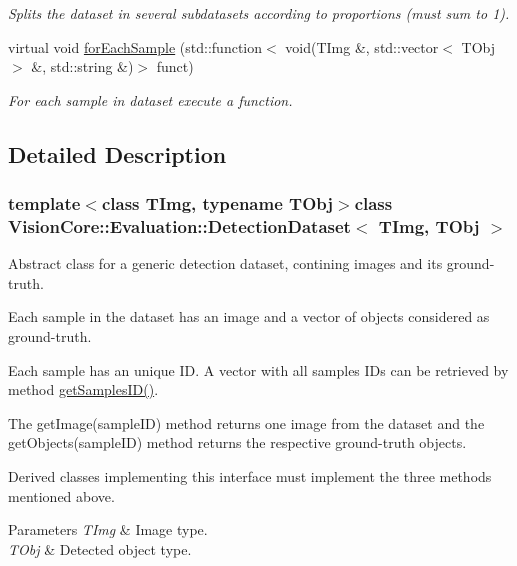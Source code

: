 \begin{DoxyCompactItemize}
\begin{DoxyCompactList}\small\item\em Splits the dataset in several subdatasets according to proportions (must sum to 1). \end{DoxyCompactList}\item 
virtual void \hyperlink{class_vision_core_1_1_evaluation_1_1_detection_dataset_af6f37eeccc1f47bbe5ec0e38199ca8bf}{for\+Each\+Sample} (std\+::function$<$ void(T\+Img \&, std\+::vector$<$ T\+Obj $>$ \&, std\+::string \&)$>$ funct)
\begin{DoxyCompactList}\small\item\em For each sample in dataset execute a function. \end{DoxyCompactList}\end{DoxyCompactItemize}


\subsection{Detailed Description}
\subsubsection*{template$<$class T\+Img, typename T\+Obj$>$class Vision\+Core\+::\+Evaluation\+::\+Detection\+Dataset$<$ T\+Img, T\+Obj $>$}

Abstract class for a generic detection dataset, contining images and its ground-\/truth. 

Each sample in the dataset has an image and a vector of objects considered as ground-\/truth.

Each sample has an unique I\+D. A vector with all samples I\+Ds can be retrieved by method \textquotesingle{}\hyperlink{class_vision_core_1_1_evaluation_1_1_detection_dataset_a4baafaba65ce3ae8e9fc8a5f74f5e0f8}{get\+Samples\+I\+D()}\textquotesingle{}.

The \textquotesingle{}get\+Image(sample\+I\+D)\textquotesingle{} method returns one image from the dataset and the \textquotesingle{}get\+Objects(sample\+I\+D)\textquotesingle{} method returns the respective ground-\/truth objects.

Derived classes implementing this interface must implement the three methods mentioned above.


\begin{DoxyParams}{Parameters}
{\em T\+Img} & Image type. \\
\hline
{\em T\+Obj} & Detected object type. \\
\hline
\end{DoxyParams}


